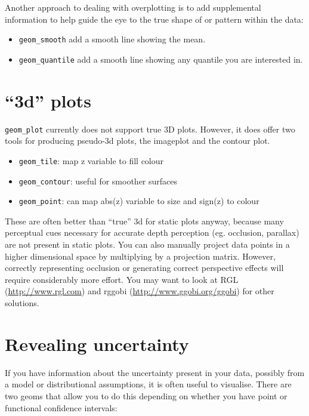 Another approach to dealing with overplotting is to add supplemental information to help guide the eye to the true shape of or pattern within the data:

\begin{itemize}
	\item {\tt geom\_smooth} add a smooth line showing the mean.
	\item {\tt geom\_quantile} add a smooth line showing any quantile you are interested in.
\end{itemize}

\section{``3d'' plots}

{\tt geom\_plot} currently does not support true 3D plots.  However, it does offer two tools for producing pseudo-3d plots, the imageplot and the contour plot.

\begin{itemize}
	\item {\tt geom\_tile}: map z variable to fill colour
	\item {\tt geom\_contour}: useful for smoother surfaces
	\item {\tt geom\_point}: can map abs(z) variable to size and sign(z) to colour
\end{itemize}

These are often better than ``true'' 3d for static plots anyway, because many perceptual cues necessary for accurate depth perception (eg. occlusion, parallax) are not present in static plots.  You can also manually project data points in a higher dimensional space by multiplying by a projection matrix.  However, correctly representing occlusion or generating correct perspective effects will require considerably more effort.  You may want to look at RGL (\url{http://www.rgl.com}) and rggobi (\url{http://www.ggobi.org/ggobi}) for other solutions.

\section{Revealing uncertainty}\label{sub:displaying_uncertainty}

If you have information about the uncertainty present in your data, possibly from a model or distributional assumptions, it is often useful to visualise.  There are two geoms that allow you to do this depending on whether you have point or functional confidence intervals:

